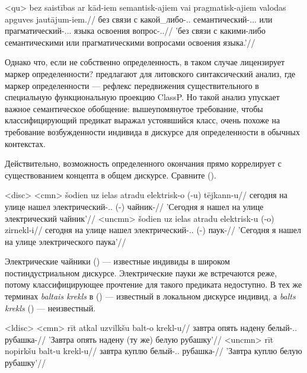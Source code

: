 \documentclass[a4paper, 12pt]{article}
\begin{document}
\ex<qu> \begingl
        \gla bez saistības ar kād-iem semantisk-ajiem vai pragmatisk-ajiem valodas apguves jautājum-iem.//
        \glb без связи с какой\_либо-\M.\Pl.\Dat{} семантический-\M.\Pl.\Def.\Dat{} или прагматический-\M.\Pl.\Def.\Dat{} языка освоения вопрос-\M.\Pl.\Dat{}//
        \glft 'без связи с какими-либо семантическими или прагматическими вопросами освоения языка.'//
    \endgl
\xe

Однако что, если не собственно определенность, в таком случае лицензирует маркер определенности? \citep{rutpro2006} предлагают для литовского синтаксический анализ, где маркер определенности --- рефлекс передвижения существительного в специальную функциональную проекцию ClassP. Но такой анализ упускает важное семантическое обобщение: вышеупомянутое требование, чтобы классифицирующий предикат выражал устоявшийся класс, очень похоже на требование возбужденности индивида в дискурсе для определенности в обычных контекстах.

Действительно, возможность определенного окончания прямо коррелирует с существованием концепта в общем дискурсе. Сравните (\nextx).

\pex<disc>
    \a<cmn> \begingl
        \gla šodien uz ielas atradu elektrisk-o (\judge{*}-u) tējkann-u//
        \glb сегодня на улице нашел электрический-\M.\Def.\Acc{} (-\Indef) чайник-\Acc{}//
        \glft 'Сегодня я нашел на улице электрический чайник'//
    \endgl
    \a<uncmn> \begingl
    \gla šodien uz ielas atradu elektrisk-u (\judge{*}-o) zirnekl-i//
    \glb сегодня на улице нашел электрический-\M.\Indef.\Acc{} (-\Def) паук-\Acc{}//
    \glft 'Сегодня я нашел на улице электрического паука'//
\endgl
\xe

Электрические чайники () --- известные индивиды в широком постиндустриальном дискурсе. Электрические пауки же встречаются реже, потому классифицирующее прочтение для такого предиката недоступно. В тех же терминах \textit{baltais krekls} в () --- известный в локальном дискурсе индивид, а \textit{balts krekls} () --- неизвестный.

\pex<ldisc>
    \a<cmn> \begingl
        \gla rīt atkal uzvilkšu balt-o krekl-u//
        \glb завтра опять надену белый-\M.\Def.\Acc{} рубашка-\Acc{}//
        \glft 'Завтра опять надену (ту же) белую рубашку'//
    \endgl
    \a<uncmn> \begingl
        \gla rīt nopirkšu balt-u krekl-u//
        \glb завтра куплю белый-\M.\Indef.\Acc{} рубашка-\Acc{}//
        \glft 'Завтра куплю белую рубашку'//
    \endgl
\xe
\end{document}
